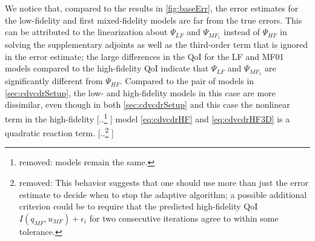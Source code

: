 \documentclass[review]{siamart0516}
\providecommand{\DIFaddtex}[1]{{\protect\color{blue} \sf #1}} %
\providecommand{\DIFdeltex}[1]{{\protect\color{red} [..\footnote{removed: #1} ]}} %
\providecommand{\DIFaddbegin}{} %
\providecommand{\DIFaddend}{} %
\providecommand{\DIFdelbegin}{} %
\providecommand{\DIFdelend}{} %
\providecommand{\DIFadd}[1]{\texorpdfstring{\DIFaddtex{#1}}{#1}} %
\providecommand{\DIFdel}[1]{\texorpdfstring{\DIFdeltex{#1}}{}} %
\newcommand{\DIFscaledelfig}{0.5}
\newlength{\DIFdelgraphicswidth} %
\newlength{\DIFdelgraphicsheight} %
\newcommand{\DIFaddincludegraphics}[2][]{{\color{blue}\fbox{\DIFOincludegraphics[#1]{#2}}}} %
\newcommand{\DIFdelincludegraphics}[2][]{%
\sbox{\DIFdelgraphicsbox}{\DIFOincludegraphics[#1]{#2}}%
\settoboxwidth{\DIFdelgraphicswidth}{\DIFdelgraphicsbox} %
\settoboxtotalheight{\DIFdelgraphicsheight}{\DIFdelgraphicsbox} %
\scalebox{\DIFscaledelfig}{%
\parbox[b]{\DIFdelgraphicswidth}{\usebox{\DIFdelgraphicsbox}\\[-\baselineskip] \rule{\DIFdelgraphicswidth}{0em}}\llap{\resizebox{\DIFdelgraphicswidth}{\DIFdelgraphicsheight}{%
\setlength{\unitlength}{\DIFdelgraphicswidth}%
\begin{picture}(1,1)%
\thicklines\linethickness{2pt} %
{\color[rgb]{1,0,0}\put(0,0){\framebox(1,1){}}}%
{\color[rgb]{1,0,0}\put(0,0){\line( 1,1){1}}}%
{\color[rgb]{1,0,0}\put(0,1){\line(1,-1){1}}}%
\end{picture}%
}\hspace*{3pt}}} %
} %
\DeclareRobustCommand{\DIFaddbegin}{\DIFOaddbegin \let\includegraphics\DIFaddincludegraphics} %
\DeclareRobustCommand{\DIFaddend}{\DIFOaddend \let\includegraphics\DIFOincludegraphics} %
\DeclareRobustCommand{\DIFdelbegin}{\DIFOdelbegin \let\includegraphics\DIFdelincludegraphics} %
\DeclareRobustCommand{\DIFdelend}{\DIFOaddend \let\includegraphics\DIFOincludegraphics} %
\begin{document}
We notice that, compared to the results in \cref{fig:baseErr}, the error estimates for the low-fidelity and first mixed-fidelity models are far from the true errors. This can be attributed to the linearization about $\Psi_{LF}$ and $\Psi_{MF_{1}}$ instead of $\Psi_{HF}$ in solving the supplementary adjoints \DIFaddbegin \DIFadd{as well as the third-order term that is ignored in the error estimate}\DIFaddend ; the large differences in the QoI for the LF and MF01 models compared to the high-fidelity QoI indicate that $\Psi_{LF}$ and $\Psi_{MF_{1}}$ are significantly different from $\Psi_{HF}$. Compared to the pair of models in \cref{sec:cdvcdrSetup}, the low- and high-fidelity models \DIFaddbegin \DIFadd{in this case }\DIFaddend are more dissimilar, even though \DIFaddbegin \DIFadd{in both }\cref{sec:cdvcdrSetup} \DIFadd{and this case }\DIFaddend the nonlinear term in the high-fidelity \DIFdelbegin \DIFdel{models remain the same. }\DIFdelend \DIFaddbegin \DIFadd{model }\cref{eq:cdvcdrHF} \DIFadd{and }\cref{eq:cdvcdrHF3D} \DIFadd{is a quadratic reaction term. }\DIFaddend %
\DIFdelbegin \DIFdel{This behavior suggests that one should use more than just the error estimate to decide when to stop the adaptive algorithm; a possible additional criterion could be to require that the predicted high-fidelity QoI $I(q_{MF},u_{MF})+\epsilon_i$ for two consecutive iterations agree to within some tolerance. %
}\DIFdelend %
\end{document}
